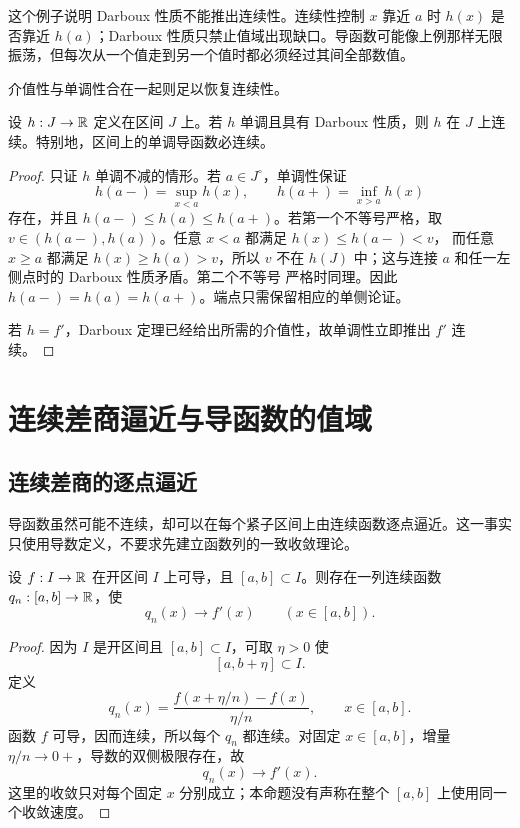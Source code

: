 这个例子说明 Darboux 性质不能推出连续性。连续性控制 \(x\) 靠近 \(a\) 时 \(h(x)\) 是否靠近 \(h(a)\)；Darboux 性质只禁止值域出现缺口。导函数可能像上例那样无限振荡，但每次从一个值走到另一个值时都必须经过其间全部数值。

介值性与单调性合在一起则足以恢复连续性。

\begin{proposition}
\label{prop:monotone-darboux-continuous}
设 \(h:J\to\mathbb{R}\) 定义在区间 \(J\) 上。若 \(h\) 单调且具有 Darboux
性质，则 \(h\) 在 \(J\) 上连续。特别地，区间上的单调导函数必连续。
\end{proposition}

\begin{proof}
只证 \(h\) 单调不减的情形。若 \(a\in J^\circ\)，单调性保证
\[
 h(a-)=\sup_{x<a}h(x),\qquad h(a+)=\inf_{x>a}h(x)
\]
存在，并且 \(h(a-)\le h(a)\le h(a+)\)。若第一个不等号严格，取
\(v\in(h(a-),h(a))\)。任意 \(x<a\) 都满足 \(h(x)\le h(a-)<v\)，
而任意 \(x\ge a\) 都满足 \(h(x)\ge h(a)>v\)，所以 \(v\) 不在 \(h(J)\)
中；这与连接 \(a\) 和任一左侧点时的 Darboux 性质矛盾。第二个不等号
严格时同理。因此 \(h(a-)=h(a)=h(a+)\)。端点只需保留相应的单侧论证。

若 \(h=f'\)，Darboux 定理已经给出所需的介值性，故单调性立即推出
\(f'\) 连续。
\end{proof}

\section{连续差商逼近与导函数的值域}

\subsection{连续差商的逐点逼近}

导函数虽然可能不连续，却可以在每个紧子区间上由连续函数逐点逼近。这一事实只使用导数定义，不要求先建立函数列的一致收敛理论。

\begin{proposition}[导函数是连续差商的逐点极限]
\label{prop:derivative-pointwise-continuous-quotients}
设 \(f:I\to\mathbb{R}\) 在开区间 \(I\) 上可导，且 \([a,b]\subset I\)。则存在一列连续函数 \(q_n:[a,b]\to\mathbb{R}\)，使
\[
 q_n(x)\longrightarrow f'(x)
 \qquad(x\in[a,b]).
\]
\end{proposition}

\begin{proof}
因为 \(I\) 是开区间且 \([a,b]\subset I\)，可取 \(\eta>0\) 使
\[
 [a,b+\eta]\subset I.
\]
定义
\[
 q_n(x)=\frac{f(x+\eta/n)-f(x)}{\eta/n},
 \qquad x\in[a,b].
\]
函数 \(f\) 可导，因而连续，所以每个 \(q_n\) 都连续。对固定 \(x\in[a,b]\)，增量 \(\eta/n\to0+\)，导数的双侧极限存在，故
\[
 q_n(x)\to f'(x).
\]
这里的收敛只对每个固定 \(x\) 分别成立；本命题没有声称在整个 \([a,b]\) 上使用同一个收敛速度。
\end{proof}

